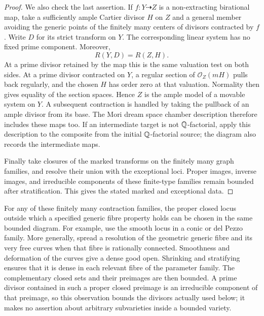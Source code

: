 \begin{proof}
We also check the last assertion.  If $f:Y\dashrightarrow Z$ is a
non-extracting birational map, take a sufficiently ample Cartier
divisor $H$ on $Z$ and a general member avoiding the generic points
of the finitely many centers of divisors contracted by $f$.
Write $D$ for its strict transform on $Y$. The corresponding linear
system has no fixed prime component.
Moreover,
\[
                 R(Y,D)=R(Z,H).
\]
At a prime divisor retained by the map this is the same valuation
test on both sides.  At a prime divisor contracted on $Y$, a
regular section of $\mathcal O_Z(mH)$ pulls back regularly, and
the chosen $H$ has order zero at that valuation.  Normality then
gives equality of the section spaces.  Hence $Z$ is the ample
model of a movable system on $Y$.  A subsequent contraction is
handled by taking the pullback of an ample divisor from its base.
The Mori dream space chamber description therefore includes these
maps too.
If an intermediate target is not $\mathbb Q$-factorial, apply this description
to the composite from the initial $\mathbb Q$-factorial source; the diagram
also records the intermediate maps.

Finally take closures of the marked transforms on the finitely
many graph families, and resolve their union with the exceptional
loci.  Proper images, inverse images, and irreducible components
of these finite-type families remain bounded after stratification.
This gives the stated marked and exceptional data.
\end{proof}

\begin{remark}\label{bd:bad-loci}
For any of these finitely many contraction families, the proper
closed locus outside which a specified generic fibre property holds
can be chosen in the same bounded diagram.  For example, use the
smooth locus in a conic or del Pezzo family.  More generally, spread
a resolution of the geometric generic fibre and its very free
curves when that fibre is rationally connected.  Smoothness and
deformation of the curves give a dense good open.  Shrinking and
stratifying ensures that it is dense in each relevant fibre of the
parameter family.  The complementary closed sets and their
preimages are then bounded.  A prime divisor contained in such a
proper closed preimage is an irreducible component of that
preimage, so this observation bounds the divisors actually used
below; it makes no assertion about arbitrary subvarieties inside
a bounded variety.
\end{remark}

